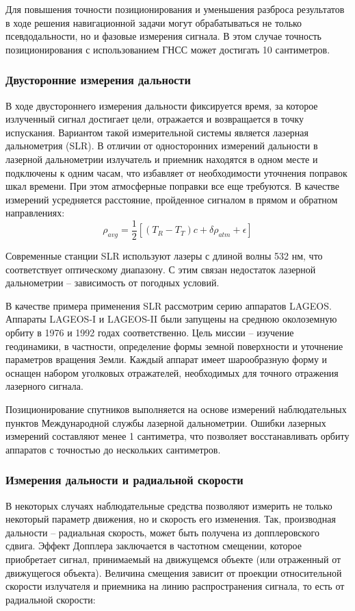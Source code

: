 Для повышения точности позиционирования и уменьшения разброса результатов
в ходе решения навигационной задачи могут обрабатываться не только псевдодальности,
но и фазовые измерения сигнала. 
В этом случае точность позиционирования с использованием ГНСС может достигать 10 сантиметров.

\subsubsection{Двусторонние измерения дальности}
В ходе двустороннего измерения дальности фиксируется время, за которое излученный сигнал
достигает цели, отражается и возвращается в точку испускания. 
Вариантом такой измерительной системы является лазерная дальнометрия (SLR).
В отличии от односторонних измерений дальности в лазерной дальнометрии излучатель и приемник
находятся в одном месте и подключены к одним часам, что избавляет от необходимости уточнения поправок шкал времени.
При этом атмосферные поправки все еще требуются. 
В качестве измерений усредняется расстояние, пройденное сигналом в прямом и обратном направлениях:
\begin{equation*}
    \rho_{avg} = \frac{1}{2} \left[ 
        \left(T_{R} - T_{T}\right) c + \delta \rho_{atm} + \epsilon \right]
\end{equation*}

Современные станции SLR используют лазеры с длиной волны 532 нм, что соответствует оптическому диапазону.
С этим связан недостаток лазерной дальнометрии -- зависимость от погодных условий.

В качестве примера применения SLR рассмотрим серию аппаратов LAGEOS.
Аппараты LAGEOS-I и LAGEOS-II были запущены на среднюю околоземную орбиту в 1976 и 1992 годах соответственно.
Цель миссии -- изучение геодинамики, в частности, определение формы земной поверхности и уточнение параметров вращения Земли. 
Каждый аппарат имеет шарообразную форму и оснащен набором уголковых отражателей, необходимых
для точного отражения лазерного сигнала.

Позиционирование спутников выполняется на основе измерений наблюдательных пунктов Международной службы лазерной дальнометрии.
Ошибки лазерных измерений составляют менее 1 сантиметра, что позволяет восстанавливать орбиту аппаратов с точностью до нескольких сантиметров.

\subsubsection{Измерения дальности и радиальной скорости}
В некоторых случаях наблюдательные средства позволяют измерить не только
некоторый параметр движения, но и скорость его изменения. 
Так, производная дальности -- радиальная скорость, может быть получена из допплеровского сдвига.
Эффект Допплера заключается в частотном смещении, которое приобретает сигнал, принимаемый на движущемся объекте (или отраженный от движущегося объекта).
Величина смещения зависит от проекции относительной скорости излучателя и приемника на линию распространения сигнала,
то есть от радиальной скорости:

